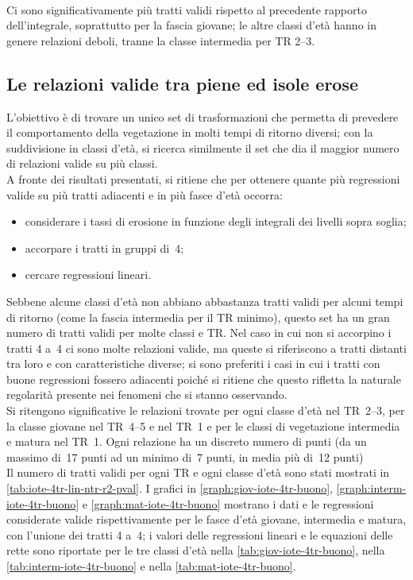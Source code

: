 %
\\
Ci sono significativamente più tratti validi rispetto al precedente rapporto dell'integrale, soprattutto per la fascia giovane; le altre classi d'età hanno in genere relazioni deboli, tranne la classe intermedia per TR \SIrange[range-phrase = {-}, range-units = single]{2}{3}{\mesi}.



\subsection{Le relazioni valide tra piene ed isole erose}
\label{sec:migliori-tratti-piene-erosione}
L'obiettivo è di trovare un unico set di trasformazioni che permetta di prevedere il comportamento della vegetazione in molti tempi di ritorno diversi; con la suddivisione in classi d'età, si ricerca similmente il set che dia il maggior numero di relazioni valide su più classi.
\\
A fronte dei risultati presentati, si ritiene che per ottenere quante più regressioni valide su più tratti adiacenti e in più fasce d'età occorra:
%
\begin{itemize}
	\item considerare i tassi di erosione in funzione degli integrali dei livelli sopra soglia;
	\item accorpare i tratti in gruppi di~4;
	\item cercare regressioni lineari.
\end{itemize}
%
Sebbene alcune classi d'età non abbiano abbastanza tratti validi per alcuni tempi di ritorno (come la fascia intermedia per il TR minimo), questo set ha un gran numero di tratti validi per molte classi e TR.
Nel caso in cui non si accorpino i tratti 4 a~4 ci sono molte relazioni valide, ma queste si riferiscono a tratti distanti tra loro e con caratteristiche diverse; si sono preferiti i casi in cui i tratti con buone regressioni fossero adiacenti poiché si ritiene che questo rifletta la naturale regolarità presente nei fenomeni che si stanno osservando.
\\
Si ritengono significative le relazioni trovate per ogni classe d'età nel TR~\SIrange[range-phrase = {-}, range-units = single]{2}{3}{\mesi}, per la classe giovane nel TR~\SIrange[range-phrase = {-}, range-units = single]{4}{5}{\mesi} e nel TR~\SI{1}{\anno} e per le classi di vegetazione intermedia e matura nel TR~\SI{1}{\anno}.
Ogni relazione ha un discreto numero di punti (da un massimo di~17 punti ad un minimo di~7 punti, in media più di~12 punti)
\\
Il numero di tratti validi per ogni TR e ogni classe d'età sono stati mostrati in \cref{tab:iote-4tr-lin-ntr-r2-pval}.
I grafici in \cref{graph:giov-iote-4tr-buono}, \cref{graph:interm-iote-4tr-buono} e \cref{graph:mat-iote-4tr-buono} mostrano i dati e le regressioni considerate valide rispettivamente per le fasce d'età giovane, intermedia e matura, con l'unione dei tratti 4 a~4;
i valori delle regressioni lineari e le equazioni delle rette sono riportate per le tre classi d'età nella \cref{tab:giov-iote-4tr-buono}, nella \cref{tab:interm-iote-4tr-buono} e nella \cref{tab:mat-iote-4tr-buono}.

